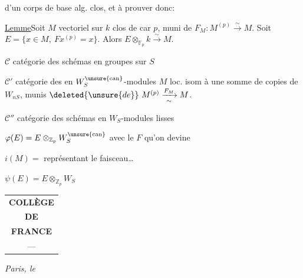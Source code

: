 d'un corps de base alg. clos, et à prouver donc:

\uline{Lemme}\quad Soit $M$ vectoriel sur $k$
 clos de car $p$,
muni de $F_M:M^{(p)}\xrightarrow{\sim}M$.
Soit $E=\{x\in M,\ Fx^{(p)}=x\}$. Alors
$E\otimes_{\mathbb F_p}k\xrightarrow{\sim}M$.


$\mathcal C$ catégorie des schémas en groupes
  sur $S$

$\mathcal C'$ catégorie des 
 en $W_S^{\unsure{\mathrm{can}}}$-modules $M$
loc. isom à une somme de copies de $W_{nS}$, munis
$\deleted{\unsure{de}}\ M^{(p)}\xrightarrow[\sim]{F_M}M$.

$\mathcal C''$ catégorie des schémas en $W_S$-modules lisses


$\varphi(E)=E\otimes_{\mathbb Z_p}W_S^{\unsure{\mathrm{can}}}$
avec le $F$ qu'on devine

$i(M)=$ 
 représentant le faisceau\dots

$\psi(E)=E\otimes_{\mathbb Z_p}W_S$

\begin{tabular}{c}
\textbf{COLLÈGE}\\[.3em]
\textbf{DE}\\[.3em]
\textbf{FRANCE}\\
---
\end{tabular}
\hfill\textit{Paris, le}

